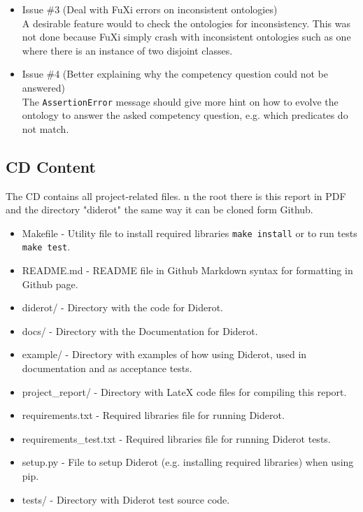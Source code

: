 \documentclass{report}
\begin{document}
\begin{itemize}
    \item Issue \#3 (Deal with FuXi errors on inconsistent ontologies) \\

        A desirable feature would to check the ontologies for inconsistency.
        This was not done because FuXi simply crash with inconsistent ontologies such as one where there is an instance of two disjoint classes. \\

    \item Issue \#4 (Better explaining why the competency question could not be answered) \\

            The \texttt{AssertionError} message should give more hint on how to evolve the ontology to answer the asked competency question, e.g. which predicates do not match.

\end{itemize}

\begin{appendices}
\chapter{CD Content}

The CD contains all project-related files. 
n the root there is this report in PDF and the directory "diderot" the same way it can be cloned form Github.

\begin{itemize}
    \item Makefile - Utility file to install required libraries \texttt{make install} or to run tests \texttt{make test}.
    \item README.md - README file in Github Markdown syntax for formatting in Github page.
    \item diderot/ - Directory with the code for Diderot.
    \item docs/ - Directory with the Documentation for Diderot.
    \item example/ - Directory with examples of how using Diderot, used in documentation and as acceptance tests.
    \item project\_report/ - Directory with LateX code files for compiling this report.
    \item requirements.txt - Required libraries file for running Diderot.
    \item requirements\_test.txt - Required libraries file for running Diderot tests.
    \item setup.py - File to setup Diderot (e.g. installing required libraries) when using pip.
    \item tests/ - Directory with Diderot test source code.
\end{itemize}

\end{appendices}



\end{document}
